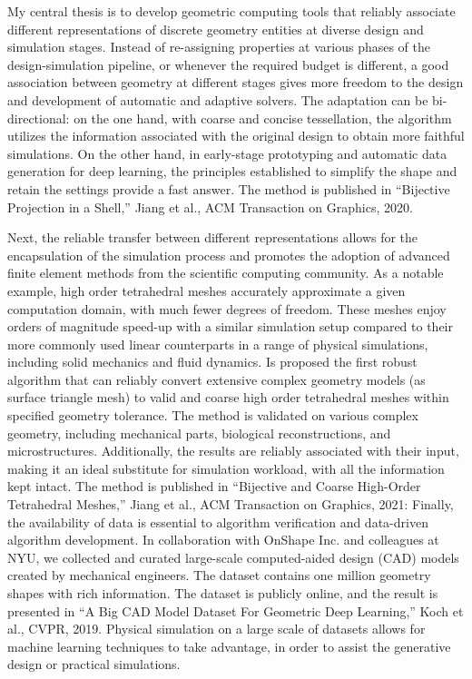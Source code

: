 My central thesis is to develop geometric computing tools that reliably associate different representations of discrete geometry entities at diverse design and simulation stages. Instead of re-assigning properties at various phases of the design-simulation pipeline, or whenever the required budget is different, a good association between geometry at different stages gives more freedom to the design and development of automatic and adaptive solvers. The adaptation can be bi-directional: on the one hand, with coarse and concise tessellation, the algorithm utilizes the information associated with the original design to obtain more faithful simulations. On the other hand, in early-stage prototyping and automatic data generation for deep learning, the principles established to simplify the shape and retain the settings provide a fast answer. The method is published in “Bijective Projection in a Shell,” Jiang et al., ACM Transaction on Graphics, 2020.

%
Next, the reliable transfer between different representations allows for the encapsulation of the simulation process and promotes the adoption of advanced finite element methods from the scientific computing community. As a notable example, high order tetrahedral meshes accurately approximate a given computation domain, with much fewer degrees of freedom. These meshes enjoy orders of magnitude speed-up with a similar simulation setup compared to their more commonly used linear counterparts in a range of physical simulations, including solid mechanics and fluid dynamics. Is proposed the first robust algorithm that can reliably convert extensive complex geometry models (as surface triangle mesh) to valid and coarse high order tetrahedral meshes within specified geometry tolerance. The method is validated on various complex geometry, including mechanical parts, biological reconstructions, and microstructures. Additionally, the results are reliably associated with their input, making it an ideal substitute for simulation workload, with all the information kept intact. The method is published in “Bijective and Coarse High-Order Tetrahedral Meshes,” Jiang et al., ACM Transaction on Graphics, 2021:
Finally, the availability of data is essential to algorithm verification and data-driven algorithm development. In collaboration with OnShape Inc. and colleagues at NYU, we collected and curated large-scale computed-aided design (CAD) models created by mechanical engineers. The dataset contains one million geometry shapes with rich information. The dataset is publicly online, and the result is presented in “A Big CAD Model Dataset For Geometric Deep Learning,” Koch et al., CVPR, 2019. Physical simulation on a large scale of datasets allows for machine learning techniques to take advantage, in order to assist the generative design or practical simulations.

